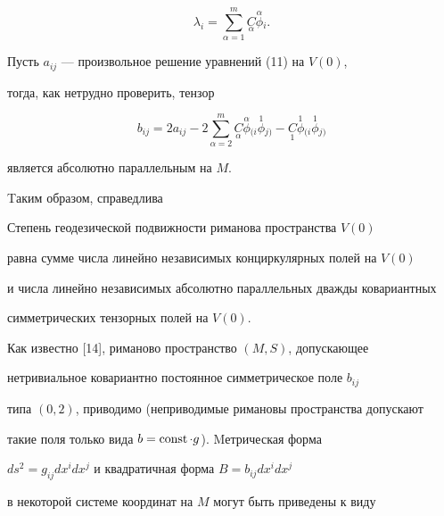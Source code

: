 $$


\lambda_i=\sum_{\alpha=1}^m\underset{\alpha}{C}{}


\overset{\alpha}{\phi} {}_i.


$$


Пусть $a_{ij}$ --- произвольное решение уравнений (11) на $V(0)$, 


тогда, как нетрудно проверить, тензор


\begin{equation}


b_{ij}= 2a_{ij}-2\sum_{\alpha=2}^m


\underset {\alpha}{C}{}\overset{\alpha}{\phi}{}_{(i}


\overset{1} {\phi}{}_{j)}-\underset{1}{C}{}


\overset{1} {\phi}{}_{(i}\overset{1} {\phi}{}_{j)}


\end{equation}


является абсолютно параллельным на $M$. 


Tаким образом, справедлива 





\begin{lem}


Степень геодезической подвижности риманова пространства $V(0)$ 


равна сумме числа линейно независимых конциркулярных полей на $V(0)$ 


и числа линейно независимых абсолютно параллельных дважды ковариантных 


симметрических тензорных полей на $V(0)$.


\end{lem}





Как известно [14], риманово пространство $(M,S)$, допускающее 


нетривиальное ковариантно постоянное симметрическое поле $b_{ij}$ 


типа $(0, 2)$, приводимо (неприводимые римановы пространства допускают 


такие поля только вида $b= \operatorname{const}\cdot g$). Mетрическая форма


$ds^2=g_{ij} dx^idx^j$ и квадратичная форма $B=b_{ij} dx^idx^j$


в некоторой системе координат на $M$ могут быть приведены к виду


